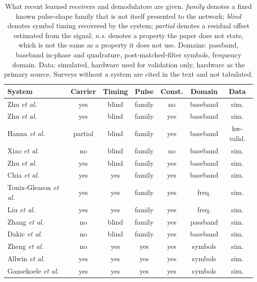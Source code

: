 \documentclass[journal]{IEEEtran}   %
\begin{document}
\begin{table}[!t]
\caption{What recent learned receivers and demodulators are given.
\emph{family} denotes a fixed known pulse-shape family that is not itself
presented to the network; \emph{blind} denotes symbol timing recovered by the
system; \emph{partial} denotes a residual offset estimated from the signal;
\emph{n.s.} denotes a property the paper does not state, which is not the same
as a property it does not use. Domains: passband, baseband in-phase and
quadrature, post-matched-filter symbols, frequency domain. Data: simulated,
hardware used for validation only, hardware as the primary source. Surveys
without a system are cited in the text and not tabulated.}
\label{tab:related_a}
\centering
\begin{tabular}{lcccccc}
\toprule
System & Carrier & Timing & Pulse & Const. & Domain & Data \\
\midrule
Zhu \textit{et al.}~\cite{Zhu2022WaveformLevelIntelligence} & yes & blind & family & no & baseband & sim. \\
Zhu \textit{et al.}~\cite{Zhu2022EndtoEnd} & yes & blind & family & yes & baseband & sim. \\
Hanna \textit{et al.}~\cite{Hanna2022SignalProcessing} & partial & blind & family & yes & baseband & hw-valid. \\
Xiao \textit{et al.}~\cite{Xiao2023_UnifiedDeep} & no & blind & family & no & baseband & sim. \\
Zhu \textit{et al.}~\cite{Zhu2023DLWave} & yes & blind & family & yes & baseband & sim. \\
Chia \textit{et al.}~\cite{Chia2022RN} & yes & yes & family & yes & baseband & sim. \\
Tonix-Gleason \textit{et al.}~\cite{Tonix2025NNAided} & yes & yes & family & yes & freq. & sim. \\
Liu \textit{et al.}~\cite{liu2026Universal} & yes & yes & family & yes & freq. & sim. \\
Zhang \textit{et al.}~\cite{Zhang2018Enhanced} & no & blind & family & yes & passband & sim. \\
Dakic \textit{et al.}~\cite{dakic2021LoRa} & no & blind & family & yes & baseband & sim. \\
Zheng \textit{et al.}~\cite{Zheng2022DemodNet} & no & yes & yes & yes & symbols & sim. \\
Allwin \textit{et al.}~\cite{alwin2024LLRSymNet} & yes & yes & yes & yes & symbols & sim. \\
Gansekoele \textit{et al.}~\cite{ganse2024MLApprochDemapping} & yes & yes & yes & yes & symbols & sim. \\

\end{tabular}
\end{table}
\end{document}
